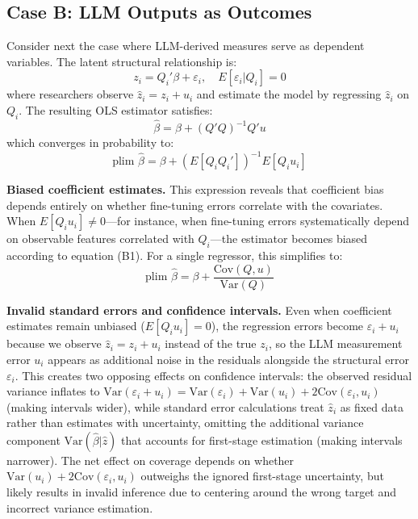 \documentclass[11pt]{article}
\begin{document}
\subsection{Case B: LLM Outputs as Outcomes}  

Consider next the case where LLM-derived measures serve as dependent variables. The latent structural relationship is:
\begin{equation}
z_i = Q_i'\beta + \varepsilon_i, \quad E[\varepsilon_i | Q_i] = 0
\end{equation}
where researchers observe $\hat{z}_i = z_i + u_i$ and estimate the model by regressing $\hat{z}_i$ on $Q_i$. The resulting OLS estimator satisfies:
\begin{equation}
\hat{\beta} = \beta + (Q'Q)^{-1}Q'u
\end{equation}
which converges in probability to:
\begin{equation}
\text{plim } \hat{\beta} = \beta + (E[Q_i Q_i'])^{-1} E[Q_i u_i] \tag{B1}
\end{equation}

\textbf{Biased coefficient estimates.} This expression reveals that coefficient bias depends entirely on whether fine-tuning errors correlate with the covariates. When $E[Q_i u_i] \neq 0$—for instance, when fine-tuning errors systematically depend on observable features correlated with $Q_i$—the estimator becomes biased according to equation (B1). For a single regressor, this simplifies to:
\begin{equation}
\text{plim } \hat{\beta} = \beta + \frac{\text{Cov}(Q, u)}{\text{Var}(Q)} \tag{B2}
\end{equation}

\textbf{Invalid standard errors and confidence intervals.} Even when coefficient estimates remain unbiased ($E[Q_i u_i] = 0$), 
the regression errors become $\varepsilon_i + u_i$ because we observe $\hat{z}_i = z_i + u_i$ instead of the true $z_i$, 
so the LLM measurement error $u_i$ appears as additional noise in the residuals alongside the structural error $\varepsilon_i$. 
This creates two opposing effects on confidence intervals: the observed residual variance 
inflates to $\text{Var}(\varepsilon_i + u_i) = \text{Var}(\varepsilon_i) + \text{Var}(u_i) + 2\text{Cov}(\varepsilon_i, u_i)$ (making intervals wider), 
while standard error calculations treat $\hat{z}_i$ as fixed data rather than estimates with uncertainty,
omitting the additional variance component $\text{Var}(\hat{\beta} | \hat{z})$ that accounts for first-stage estimation (making intervals narrower). 
The net effect on coverage depends on whether $\text{Var}(u_i) + 2\text{Cov}(\varepsilon_i, u_i)$ outweighs the ignored first-stage uncertainty,
but likely results in invalid inference due to centering around the wrong target and incorrect variance estimation.
\end{document}
